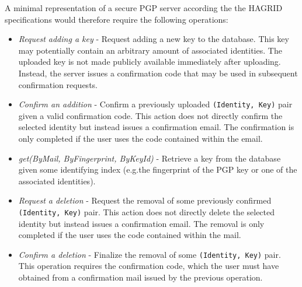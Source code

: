 A minimal representation of a secure PGP server according the the HAGRID specifications would therefore require the following operations:
\begin{itemize}
    \item \emph{Request adding a key} - Request adding a new key to the database. This key may potentially contain an arbitrary amount of associated identities. The uploaded key is not made publicly available immediately after uploading. Instead, the server issues a confirmation code that may be used in subsequent confirmation requests.
    \item \emph{Confirm an addition} - Confirm a previously uploaded \texttt{(Identity, Key)} pair given a valid confirmation code. This action does not directly confirm the selected identity but instead issues a confirmation email. The confirmation is only completed if the user uses the code contained within the email.
    \item \emph{get(ByMail, ByFingerprint, ByKeyId)} - Retrieve a key from the database given some identifying index (e.g.the fingerprint of the PGP key or one of the associated identities).
    \item \emph{Request a deletion} - Request the removal of some previously confirmed \texttt{(Identity, Key)} pair. This action does not directly delete the selected identity but instead issues a confirmation email. The removal is only completed if the user uses the code contained within the mail.
    \item \emph{Confirm a deletion} - Finalize the removal of some \texttt{(Identity, Key)} pair. This operation requires the confirmation code, which the user must have obtained from a confirmation mail issued by the previous operation.
\end{itemize}

